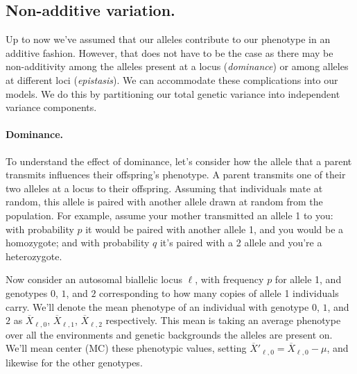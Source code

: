 \subsection{Non-additive variation.}
\label{section:nonAddVar}
Up to now we've assumed that our alleles contribute to our phenotype in an
additive fashion. However, that does not have to be the case as there may be
non-additivity among the alleles present at a locus (\emph{dominance}) or among
alleles at different loci (\emph{epistasis}). We can accommodate these complications
into our models. We do this by partitioning our total genetic variance into
independent variance components.





\paragraph{Dominance.} To understand the effect of dominance, let's consider how the allele
that a parent transmits influences their offspring's
phenotype. A parent transmits one of their two alleles at a locus to their offspring. 
Assuming that individuals mate at random, this allele is paired with another allele drawn at random from the population.
For example, assume your mother transmitted an allele 1 to you: with probability $p$ it would be paired with another allele 1, and you would be a homozygote; and with probability $q$ it's paired with a 2 allele and you're a heterozygote.


Now consider an autosomal biallelic locus $\ell$, with frequency $p$ for allele 1, and
genotypes $0$, $1$, and $2$ corresponding to how many copies of allele
1 individuals carry. We'll denote the mean phenotype of an individual
with genotype $0$, $1$, and $2$ as $\overline{X}_{\ell,0}$,
$\overline{X}_{\ell,1}$, $\overline{X}_{\ell,2}$ respectively. This mean is
taking an average phenotype over all the environments and genetic backgrounds the alleles
are present on. We'll mean center (MC)
these phenotypic values, setting $\overline{X}'_{\ell,0} = \overline{X}_{\ell,0} - \mu$, and
likewise for the other genotypes. 

